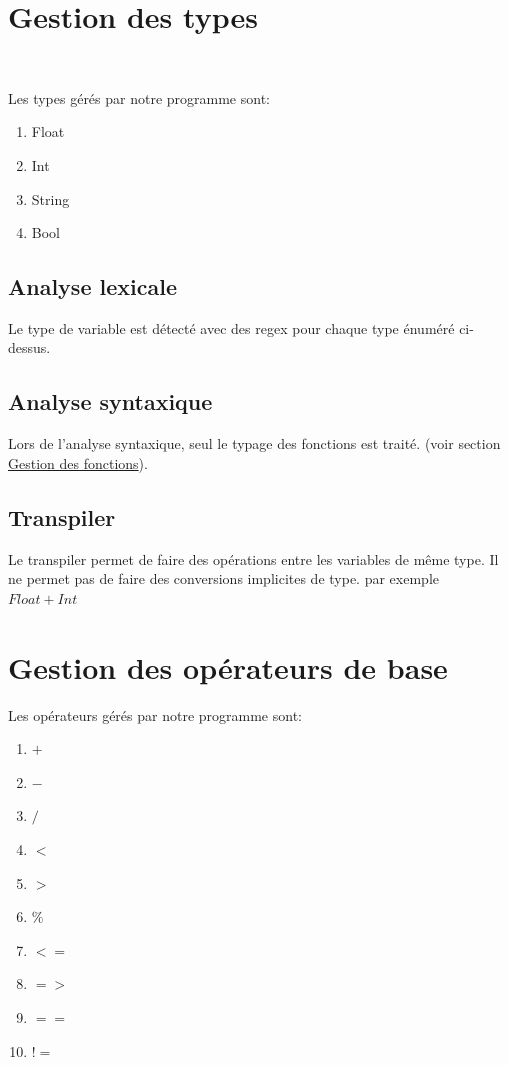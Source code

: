 \section{Gestion des types}
~\label{section:Type}

Les types gérés par notre programme sont:
\begin{enumerate}
    \item Float
    \item Int
    \item String
    \item Bool
\end{enumerate}

\subsection*{Analyse lexicale}

Le type de variable est détecté avec des regex pour chaque type énuméré ci-dessus.

\subsection*{Analyse syntaxique}

Lors de l'analyse syntaxique, seul le typage des fonctions est traité. (voir section \hyperref[section:Fonctions]{Gestion des fonctions}).

\subsection*{Transpiler}
Le transpiler permet de faire des opérations entre les variables de même type.
Il ne permet pas de faire des conversions implicites de type. par exemple  \(Float+Int\)

\newpage


\section{Gestion des opérateurs de base}

Les opérateurs gérés par notre programme sont:
\begin{enumerate}
    \item \(+\)
    \item \(-\)
    \item \(/\)
    \item \(<\)
    \item \(>\)
    \item \(\%\)
    \item \(<=\)
    \item \(=>\)
    \item \(==\)
    \item \(!=\)
\end{enumerate}

